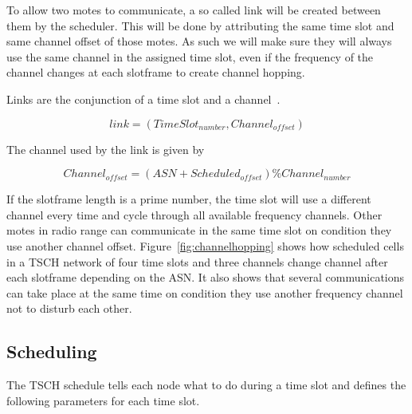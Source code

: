 To allow two motes to communicate, a so called link will be created between
them by the scheduler.
This will be done by attributing the same time slot and  same channel offset
of those motes.
As such we will make sure they will always use the same channel in the assigned
time slot, even if the frequency of the channel changes at each slotframe to
create channel hopping.

Links are the conjunction of a time slot and a channel~\cite{Chen2013PerformanceAO}.

\begin{equation}
  \label{eq:links}
  link = (TimeSlot_{number}, Channel_{offset})
\end{equation}

%

The channel used by the link is given by

\begin{equation}
  \label{eq:channel}
  Channel_{offset} = (ASN + Scheduled_{offset}) \% Channel_{number}
\end{equation}

If the slotframe length is a prime number,
the time slot will use a different channel every time and cycle through all
available frequency channels.
Other motes in radio range can communicate in the same time slot on condition
they use another channel offset.
Figure~\ref{fig:channelhopping} shows how scheduled cells in a TSCH network of
four time slots and three channels change channel after each slotframe depending
on the ASN. It also shows that several communications can take place at the same
time on condition they use another frequency channel not to disturb each other.



\subsection{Scheduling\label{section:tschscheduling}}

The TSCH schedule tells each node what to do during a time slot and defines the
following parameters for each time slot.

